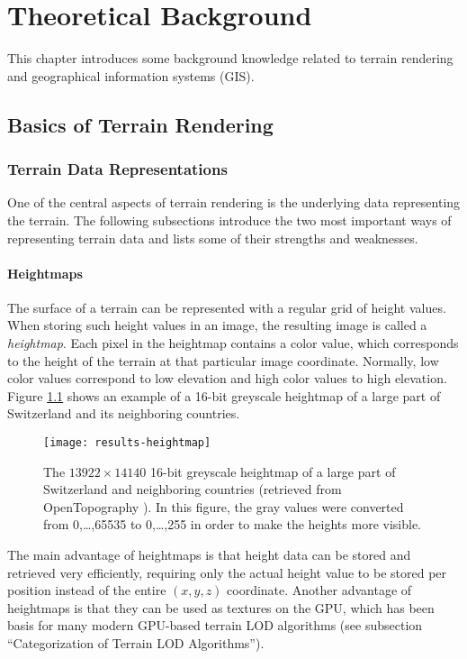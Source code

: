 \chapter{Theoretical Background}
This chapter introduces some background knowledge related to
terrain rendering and geographical information systems (GIS).

\section{Basics of Terrain Rendering}
\subsection{Terrain Data Representations}
One of the central aspects of terrain rendering 
is the underlying data representing the terrain.
The following subsections introduce the two most important 
ways of representing terrain data and
lists some of their strengths and weaknesses.

\subsubsection{Heightmaps}
The surface of a terrain can be represented
with a regular grid of height values.
When storing such height values in an image, the resulting 
image is called a \textit{heightmap}. Each pixel 
in the heightmap contains a color value, which corresponds 
to the height of the terrain at that particular image coordinate. 
Normally, low color values correspond to low elevation 
and high color values to high elevation. Figure \ref{fig:results-heightmap}
shows an example of a 16-bit greyscale heightmap of a large part of Switzerland
and its neighboring countries.

\begin{figure}[H]
  \centering
  \texttt{[image: results-heightmap]}
  \caption{The $13922 \times 14140$ 16-bit greyscale heightmap of a large part of Switzerland and neighboring countries (retrieved from OpenTopography \cite{srtm2013}). In this figure, the gray values were converted from 0,\dots,65535 to 0,\dots,255 in order to make the heights more visible.}\label{fig:results-heightmap}
\end{figure}

The main advantage of heightmaps is that height data 
can be stored and retrieved very efficiently,
requiring only the actual height value to be stored per position
instead of the entire $(x,y,z)$ coordinate. 
Another advantage of heightmaps is that they can be 
used as textures on the GPU, which has been basis for many
modern GPU-based terrain LOD algorithms (see subsection ``Categorization of Terrain LOD Algorithms'').

